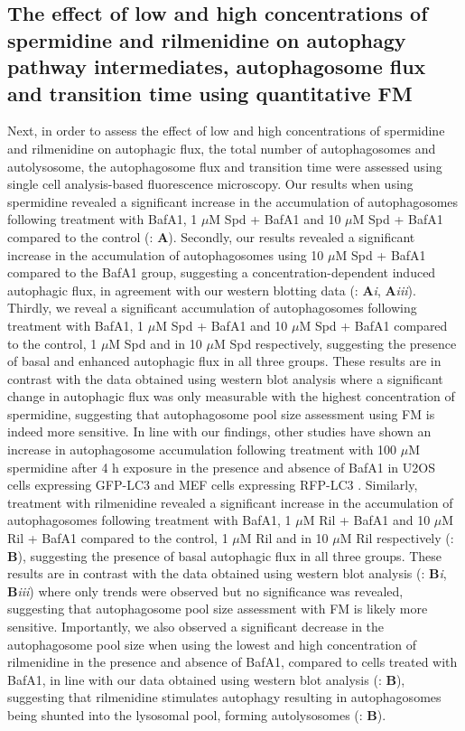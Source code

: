 {\subsection{The effect of low and high concentrations of spermidine and rilmenidine on autophagy pathway intermediates, autophagosome flux and transition time using quantitative FM}
Next, in order to assess the effect of low and high concentrations of spermidine and rilmenidine on autophagic flux, the total number of autophagosomes and autolysosome, the autophagosome flux and transition time \citep{loos2014} were assessed using single cell analysis-based fluorescence microscopy. Our results when using spermidine revealed a significant increase in the accumulation of autophagosomes following treatment with BafA1, 1 $\mu$M Spd + BafA1 and 10 $\mu$M Spd + BafA1 compared to the control (: \textbf{A}). Secondly, our results revealed a significant increase in the accumulation of autophagosomes using 10 $\mu$M Spd + BafA1 compared to the BafA1 group, suggesting a concentration-dependent induced autophagic flux, in agreement with our western blotting data (: \textbf{A}\textit{i}, \textbf{A}\textit{iii}).  Thirdly, we reveal a significant accumulation of autophagosomes following treatment with BafA1, 1 $\mu$M Spd + BafA1 and 10 $\mu$M Spd + BafA1 compared to the control, 1 $\mu$M Spd and in 10 $\mu$M Spd respectively, suggesting the presence of basal and enhanced autophagic flux in all three groups. These results are in contrast with the data obtained using western blot analysis where a significant change in autophagic flux was only measurable with the highest concentration of spermidine, suggesting that autophagosome pool size assessment using FM is indeed more sensitive. In line with our findings, other studies have shown an increase in autophagosome accumulation following treatment with 100 $\mu$M spermidine after 4 h exposure in the presence and absence of BafA1 in U2OS cells expressing GFP-LC3  \citep{Pietrocola2015} and MEF cells expressing RFP-LC3 \citep{Yue2017}. Similarly, treatment with rilmenidine revealed a significant increase in the accumulation of autophagosomes following treatment with BafA1, 1 $\mu$M Ril + BafA1 and 10 $\mu$M Ril + BafA1 compared to the control, 1 $\mu$M Ril and in 10 $\mu$M Ril respectively (: \textbf{B}), suggesting the presence of basal autophagic flux in all three groups. These results are in contrast with the data obtained using western blot analysis (: \textbf{B}\textit{i}, \textbf{B}\textit{iii}) where only trends were observed but no significance was revealed, suggesting that autophagosome pool size assessment with FM is likely more sensitive.  Importantly, we also observed a significant decrease in the autophagosome pool size when using the lowest and high concentration of rilmenidine in the presence and absence of BafA1, compared to cells treated with BafA1, in line with our data obtained using western blot analysis (: \textbf{B}), suggesting that rilmenidine stimulates autophagy resulting in autophagosomes being shunted into the lysosomal pool, forming autolysosomes (: \textbf{B}). 

}
